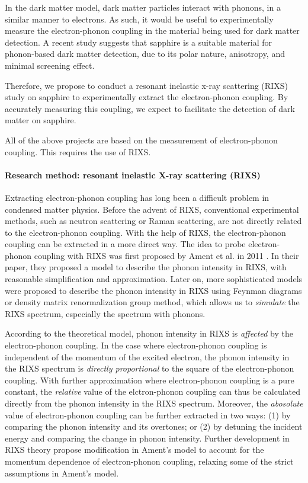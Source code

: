 \documentclass[11pt]{article}
\begin{document}
In the dark matter model, dark matter particles interact with phonons, in a similar manner to electrons. As such, it would be useful to experimentally measure the electron-phonon coupling in the material being used for dark matter detection. A recent study suggests that sapphire is a suitable material for phonon-based dark matter detection, due to its polar nature, anisotropy, and minimal screening effect.
  
Therefore, we propose to conduct a resonant inelastic x-ray scattering (RIXS) study on sapphire to experimentally extract the electron-phonon coupling. By accurately measuring this coupling, we expect to facilitate the detection of dark matter on sapphire.

All of the above projects are based on the measurement of electron-phonon coupling. This requires the use of RIXS.

\paragraph{Research method: resonant inelastic X-ray scattering (RIXS)}
Extracting electron-phonon coupling has long been a difficult problem in condensed matter physics. Before the advent of RIXS, conventional experimental methods, such as neutron scattering or Raman scattering, are not directly related to the electron-phonon coupling. With the help of RIXS, the electron-phonon coupling can be extracted in a more direct way. The idea to probe electron-phonon coupling with RIXS was first proposed by Ament et al. in 2011 \cite{ament_resonant_2011}. In their paper, they proposed a model to describe the phonon intensity in RIXS, with reasonable simplification and approximation. Later on, more sophisticated models were proposed to describe the phonon intensity in RIXS using Feynman diagrams \cite{devereaux_directly_2016,matsubayashi_numerical_2023} or density matrix renormalization group method\cite{nocera_computing_2018}, which allows us to \textit{simulate}  the RIXS spectrum, especially the spectrum with phonons. 

According to the theoretical model, phonon intensity in RIXS is \textit{affected}  by the electron-phonon coupling\cite{devereaux_directly_2016}. In the case where electron-phonon coupling is independent of the momentum of the excited electron, the phonon intensity in the RIXS spectrum is \textit{directly proportional}  to the square of the electron-phonon coupling. With further approximation where electron-phonon coupling is a pure constant, the \textit{relative} value of the elctron-phonon coupling can thus be calculated directly from the phonon intensity in the RIXS spectrum. Moreover, the \textit{abosolute} value of electron-phonon coupling can be further extracted in two ways: (1) by comparing the phonon intensity and its overtones; or (2) by detuning the incident energy and comparing the change in phonon intensity\cite{ament_resonant_2011,braicovich_determining_2020}. Further development in RIXS theory propose modification in Ament's model to account for the momentum dependence of electron-phonon coupling, relaxing some of the strict assumptions in Ament's model\cite{bieniasz_theory_2022,geondzhian_generalization_2020}. 
\end{document}
